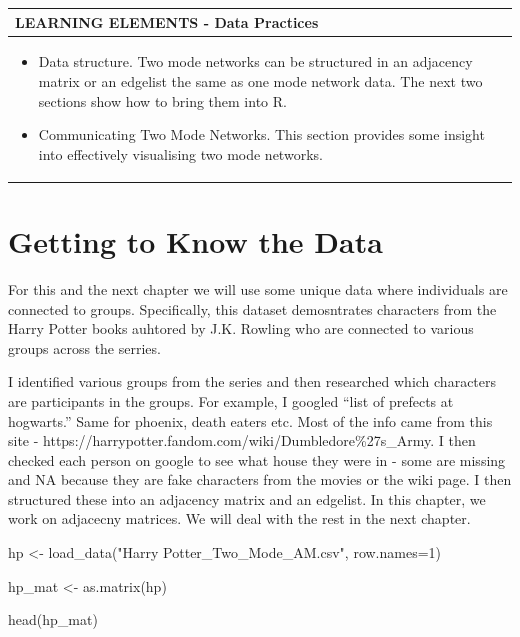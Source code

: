 \documentclass[
  letterpaper,
  DIV=11,
  numbers=noendperiod]{scrreprt}
\newenvironment{Shaded}{\begin{snugshade}}{\end{snugshade}}
\newcommand{\AttributeTok}[1]{\textcolor[rgb]{0.40,0.45,0.13}{#1}}
\newcommand{\DecValTok}[1]{\textcolor[rgb]{0.68,0.00,0.00}{#1}}
\newcommand{\FunctionTok}[1]{\textcolor[rgb]{0.28,0.35,0.67}{#1}}
\newcommand{\NormalTok}[1]{\textcolor[rgb]{0.00,0.23,0.31}{#1}}
\newcommand{\OtherTok}[1]{\textcolor[rgb]{0.00,0.23,0.31}{#1}}
\newcommand{\StringTok}[1]{\textcolor[rgb]{0.13,0.47,0.30}{#1}}
\begin{document}
\begin{longtable}[]{@{}
  >{\raggedright\arraybackslash}p{}@{}}
\toprule\noalign{}
\begin{minipage}[b]{\linewidth}\raggedright
LEARNING ELEMENTS - Data Practices
\end{minipage} \\
\midrule\noalign{}
\endhead
\bottomrule\noalign{}
\endlastfoot
\begin{minipage}[t]{\linewidth}\raggedright
\begin{itemize}
\item
  Data structure. Two mode networks can be structured in an adjacency
  matrix or an edgelist the same as one mode network data. The next two
  sections show how to bring them into R.
\item
  Communicating Two Mode Networks. This section provides some insight
  into effectively visualising two mode networks.
\end{itemize}
\end{minipage} \\
\end{longtable}

\section{Getting to Know the Data}\label{getting-to-know-the-data}

For this and the next chapter we will use some unique data where
individuals are connected to groups. Specifically, this dataset
demosntrates characters from the Harry Potter books auhtored by J.K.
Rowling who are connected to various groups across the serries.

I identified various groups from the series and then researched which
characters are participants in the groups. For example, I googled ``list
of prefects at hogwarts.'' Same for phoenix, death eaters etc. Most of
the info came from this site -
https://harrypotter.fandom.com/wiki/Dumbledore\%27s\_Army. I then
checked each person on google to see what house they were in - some are
missing and NA because they are fake characters from the movies or the
wiki page. I then structured these into an adjacency matrix and an
edgelist. In this chapter, we work on adjacecny matrices. We will deal
with the rest in the next chapter.

\begin{Shaded}
\begin{Highlighting}[]
\NormalTok{hp }\OtherTok{\textless{}{-}} \FunctionTok{load\_data}\NormalTok{(}\StringTok{"Harry Potter\_Two\_Mode\_AM.csv"}\NormalTok{, }\AttributeTok{row.names=}\DecValTok{1}\NormalTok{)}

\NormalTok{hp\_mat }\OtherTok{\textless{}{-}} \FunctionTok{as.matrix}\NormalTok{(hp)}

\FunctionTok{head}\NormalTok{(hp\_mat)}
\end{Highlighting}
\end{Shaded}
\end{document}

